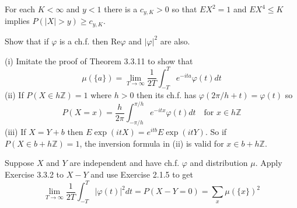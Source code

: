   \begin{exercise}[Durrett 3.2.17]
    For each $K < \infty$ and $y < 1$ there is a $c_{y,K} > 0$ so that $EX^2 = 1$ and $EX^4 \leq K$ implies $P(|X| > y) \geq c_{y,K}$.
  \end{exercise}
  \begin{solution}

  \end{solution}

  \begin{exercise}[Durrett 3.3.1]
    Show that if $\varphi$ is a ch.f. then $\text{Re} \varphi$ and $|\varphi|^2$ are also.
  \end{exercise}
  \begin{solution}

  \end{solution}

  \begin{exercise}[Durrett 3.3.2]
    (i) Imitate the proof of Theorem 3.3.11 to show that
    \begin{equation*}
      \mu(\{a\}) = \lim_{T \to \infty} \frac{1}{2T} \int_{-T}^T e^{-ita} \varphi(t) dt
    \end{equation*}
    (ii) If $P(X \in h\mathbb{Z}) = 1$ where $h > 0$ then its ch.f. has $\varphi(2\pi/h + t) = \varphi(t)$ so
    \begin{equation*}
      P(X = x) = \frac{h}{2\pi} \int_{-\pi/h}^{\pi/h} e^{-itx} \varphi(t) dt \quad \text{for } x \in h\mathbb{Z}
    \end{equation*}
    (iii) If $X = Y + b$ then $E \exp(itX) = e^{itb} E \exp(itY)$. So if $P(X \in b + h\mathbb{Z}) = 1$, the inversion formula in (ii) is valid for $x \in b + h\mathbb{Z}$.
  \end{exercise}
  \begin{solution}

  \end{solution}

  \begin{exercise}[Durrett 3.3.3]
    Suppose $X$ and $Y$ are independent and have ch.f. $\varphi$ and distribution $\mu$. Apply Exercise 3.3.2 to $X - Y$ and use Exercise 2.1.5 to get
    \begin{equation*}
      \lim_{T \to \infty} \frac{1}{2T} \int_{-T}^T |\varphi(t)|^2 dt = P(X - Y = 0) = \sum_x \mu(\{x\})^2
    \end{equation*}
  \end{exercise}
  \begin{solution}

  \end{solution}

